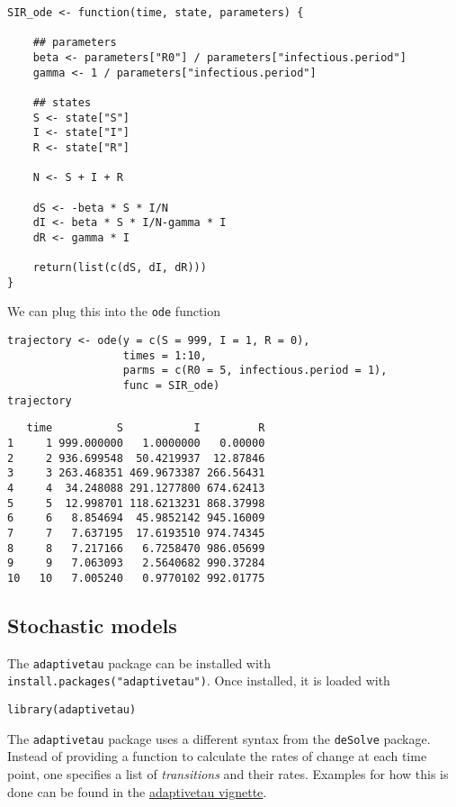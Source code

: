 \documentclass[11pt,a4paper]{article}
\begin{document}
\begin{verbatim}
SIR_ode <- function(time, state, parameters) {

    ## parameters
    beta <- parameters["R0"] / parameters["infectious.period"]
    gamma <- 1 / parameters["infectious.period"]

    ## states
    S <- state["S"]
    I <- state["I"]
    R <- state["R"]

    N <- S + I + R

    dS <- -beta * S * I/N
    dI <- beta * S * I/N-gamma * I
    dR <- gamma * I

    return(list(c(dS, dI, dR)))
}
\end{verbatim}

We can plug this into the \verb~ode~ function \\

\begin{verbatim}
trajectory <- ode(y = c(S = 999, I = 1, R = 0),
                  times = 1:10,
                  parms = c(R0 = 5, infectious.period = 1),
                  func = SIR_ode)
trajectory
\end{verbatim}

\begin{verbatim}
   time          S           I         R
1     1 999.000000   1.0000000   0.00000
2     2 936.699548  50.4219937  12.87846
3     3 263.468351 469.9673387 266.56431
4     4  34.248088 291.1277800 674.62413
5     5  12.998701 118.6213231 868.37998
6     6   8.854694  45.9852142 945.16009
7     7   7.637195  17.6193510 974.74345
8     8   7.217166   6.7258470 986.05699
9     9   7.063093   2.5640682 990.37284
10   10   7.005240   0.9770102 992.01775
\end{verbatim}

\subsection{Stochastic models}
\label{sec-6-2}

The \verb~adaptivetau~ package can be installed with \verb~install.packages("adaptivetau")~. Once installed, it is loaded with \\

\begin{verbatim}
library(adaptivetau)
\end{verbatim}

The \verb~adaptivetau~ package uses a different syntax from the \verb~deSolve~ package. Instead of providing a function to calculate the rates of change at each time point, one specifies a list of \emph{transitions} and their rates. Examples for how this is done can be found in the \href{http://cran.r-project.org/web/packages/adaptivetau/vignettes/adaptivetau.pdf}{adaptivetau vignette}. \\
\end{document}
